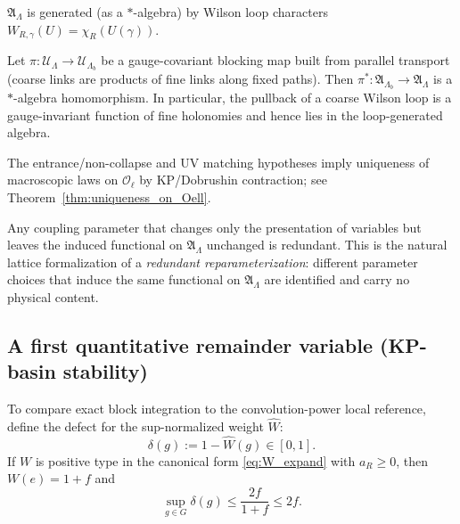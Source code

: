 \begin{proposition}\label{prop:loop_generators}
$\mathfrak A_\Lambda$ is generated (as a $*$-algebra) by Wilson loop characters $W_{R,\gamma}(U)=\chi_R(U(\gamma))$.
\end{proposition}

\begin{proposition}\label{prop:pullback_invariant_algebra}
Let $\pi:\mathcal U_\Lambda\to\mathcal U_{\Lambda_b}$ be a gauge-covariant blocking map built from parallel transport (coarse links are products of fine links along fixed paths).
Then $\pi^*: \mathfrak A_{\Lambda_b}\to\mathfrak A_\Lambda$ is a $*$-algebra homomorphism.
In particular, the pullback of a coarse Wilson loop is a gauge-invariant function of fine holonomies and hence lies in the loop-generated algebra.
\end{proposition}

\begin{remark}
The entrance/non-collapse and UV matching hypotheses imply uniqueness of macroscopic laws on $\mathcal O_{\ell}$ by KP/Dobrushin contraction;
see Theorem~\ref{thm:uniqueness_on_Oell}.
\end{remark}

\begin{remark}
Any coupling parameter that changes only the presentation of variables but leaves the induced functional on $\mathfrak A_\Lambda$ unchanged is redundant.
This is the natural lattice formalization of a \emph{redundant reparameterization}: different parameter choices that induce the same functional on $\mathfrak A_\Lambda$ are identified and carry no physical content.
\end{remark}

\subsection{A first quantitative remainder variable (KP-basin stability)}\label{sec:remainder}

To compare exact block integration to the convolution-power local reference, define the defect for the sup-normalized weight $\widehat W$:
\[
\delta(g):=1-\widehat W(g)\in[0,1].
\]
If $W$ is positive type in the canonical form \eqref{eq:W_expand} with $a_R\ge 0$, then $W(e)=1+f$ and
\begin{equation}\label{eq:defect_bound}
\sup_{g\in G}\delta(g)\le \frac{2f}{1+f}\le 2f.
\end{equation}

